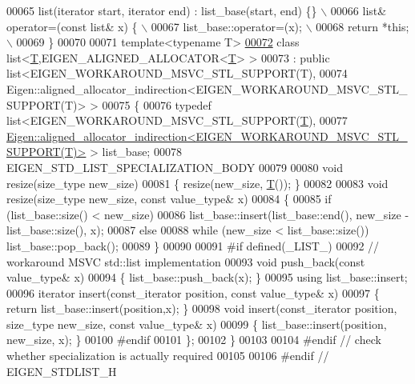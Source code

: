 \begin{DoxyCode}
00065 \textcolor{preprocessor}{    list(iterator start, iterator end) : list\_base(start, end) \{\}  \(\backslash\)}
00066 \textcolor{preprocessor}{    list& operator=(const list& x) \{  \(\backslash\)}
00067 \textcolor{preprocessor}{    list\_base::operator=(x);  \(\backslash\)}
00068 \textcolor{preprocessor}{    return *this; \(\backslash\)}
00069 \textcolor{preprocessor}{  \}}
00070 
00071   \textcolor{keyword}{template}<\textcolor{keyword}{typename} T>
\hyperlink{classstd_1_1list_3_01_t_00_01_e_i_g_e_n___a_l_i_g_n_e_d___a_l_l_o_c_a_t_o_r_3_01_t_01_4_01_4}{00072}   \textcolor{keyword}{class }list<\hyperlink{group___sparse_core___module}{T},EIGEN\_ALIGNED\_ALLOCATOR<\hyperlink{group___sparse_core___module}{T}> >
00073     : \textcolor{keyword}{public} list<EIGEN\_WORKAROUND\_MSVC\_STL\_SUPPORT(T),
00074                   Eigen::aligned\_allocator\_indirection<EIGEN\_WORKAROUND\_MSVC\_STL\_SUPPORT(T)> >
00075   \{
00076     \textcolor{keyword}{typedef} list<EIGEN\_WORKAROUND\_MSVC\_STL\_SUPPORT(\hyperlink{group___sparse_core___module}{T}),
00077                  
      \hyperlink{class_eigen_1_1aligned__allocator__indirection}{Eigen::aligned\_allocator\_indirection<EIGEN\_WORKAROUND\_MSVC\_STL\_SUPPORT(T)>}
       > list\_base;
00078     EIGEN\_STD\_LIST\_SPECIALIZATION\_BODY
00079 
00080     \textcolor{keywordtype}{void} resize(size\_type new\_size)
00081     \{ resize(new\_size, \hyperlink{group___sparse_core___module}{T}()); \}
00082 
00083     \textcolor{keywordtype}{void} resize(size\_type new\_size, \textcolor{keyword}{const} value\_type& x)
00084     \{
00085       \textcolor{keywordflow}{if} (list\_base::size() < new\_size)
00086         list\_base::insert(list\_base::end(), new\_size - list\_base::size(), x);
00087       \textcolor{keywordflow}{else}
00088         \textcolor{keywordflow}{while} (new\_size < list\_base::size()) list\_base::pop\_back();
00089     \}
00090 
00091 \textcolor{preprocessor}{#if defined(\_LIST\_)}
00092     \textcolor{comment}{// workaround MSVC std::list implementation}
00093     \textcolor{keywordtype}{void} push\_back(\textcolor{keyword}{const} value\_type& x)
00094     \{ list\_base::push\_back(x); \} 
00095     \textcolor{keyword}{using} list\_base::insert;  
00096     iterator insert(const\_iterator position, \textcolor{keyword}{const} value\_type& x)
00097     \{ \textcolor{keywordflow}{return} list\_base::insert(position,x); \}
00098     \textcolor{keywordtype}{void} insert(const\_iterator position, size\_type new\_size, \textcolor{keyword}{const} value\_type& x)
00099     \{ list\_base::insert(position, new\_size, x); \}
00100 \textcolor{preprocessor}{#endif}
00101   \};
00102 \}
00103 
00104 \textcolor{preprocessor}{#endif // check whether specialization is actually required}
00105 
00106 \textcolor{preprocessor}{#endif // EIGEN\_STDLIST\_H}
\end{DoxyCode}

